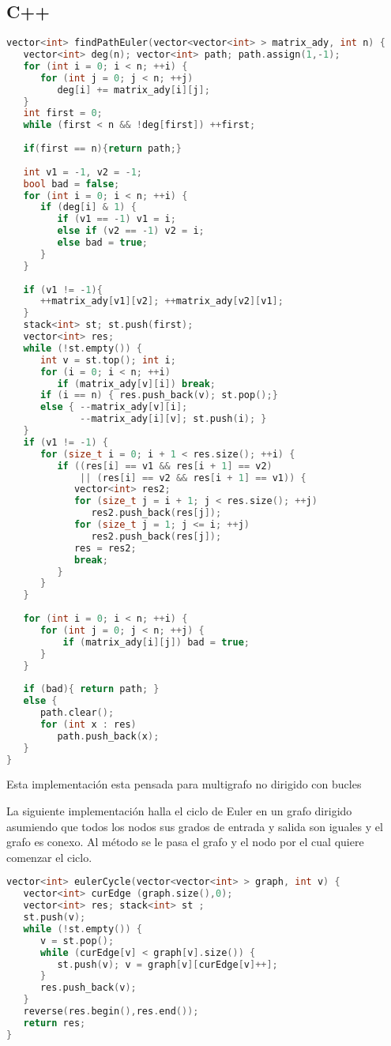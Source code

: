 \subsection{C++}
\begin{lstlisting}[language=C++]
vector<int> findPathEuler(vector<vector<int> > matrix_ady, int n) {
   vector<int> deg(n); vector<int> path; path.assign(1,-1);
   for (int i = 0; i < n; ++i) {
      for (int j = 0; j < n; ++j)
         deg[i] += matrix_ady[i][j];
   }
   int first = 0;
   while (first < n && !deg[first]) ++first;
   
   if(first == n){return path;}
	
   int v1 = -1, v2 = -1;
   bool bad = false;
   for (int i = 0; i < n; ++i) {
      if (deg[i] & 1) {
         if (v1 == -1) v1 = i;
         else if (v2 == -1) v2 = i;
         else bad = true;
      }
   }
   
   if (v1 != -1){
      ++matrix_ady[v1][v2]; ++matrix_ady[v2][v1];
   }	
   stack<int> st; st.push(first);
   vector<int> res;
   while (!st.empty()) {
      int v = st.top(); int i;
      for (i = 0; i < n; ++i)
         if (matrix_ady[v][i]) break;
      if (i == n) { res.push_back(v); st.pop();} 
      else { --matrix_ady[v][i];
             --matrix_ady[i][v]; st.push(i); }
   }
   if (v1 != -1) {
      for (size_t i = 0; i + 1 < res.size(); ++i) {
         if ((res[i] == v1 && res[i + 1] == v2)
             || (res[i] == v2 && res[i + 1] == v1)) {
            vector<int> res2;
            for (size_t j = i + 1; j < res.size(); ++j)
               res2.push_back(res[j]);
            for (size_t j = 1; j <= i; ++j)
               res2.push_back(res[j]);
            res = res2;
            break;
         }
      }
   }
	
   for (int i = 0; i < n; ++i) {
      for (int j = 0; j < n; ++j) {
          if (matrix_ady[i][j]) bad = true;
      }
   }
	
   if (bad){ return path; } 
   else {
      path.clear();
      for (int x : res)
         path.push_back(x);
   }
}
\end{lstlisting}

Esta implementación esta pensada para multigrafo no dirigido con bucles

La siguiente implementación  halla el ciclo de Euler en un grafo dirigido asumiendo que todos los nodos sus grados de entrada y salida son iguales y el grafo es conexo. Al método se le pasa el grafo y el nodo por el cual quiere comenzar el ciclo.

\begin{lstlisting}[language=C++]
vector<int> eulerCycle(vector<vector<int> > graph, int v) {
   vector<int> curEdge (graph.size(),0);
   vector<int> res; stack<int> st ;
   st.push(v);
   while (!st.empty()) {
      v = st.pop();
      while (curEdge[v] < graph[v].size()) {
         st.push(v); v = graph[v][curEdge[v]++];
      }
      res.push_back(v);
   }
   reverse(res.begin(),res.end());
   return res;
}
\end{lstlisting}

